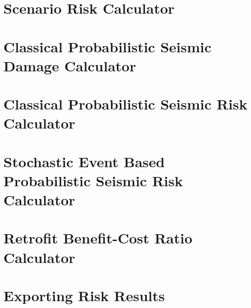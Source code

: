 \section{Scenario Risk Calculator}
\label{sec:config_scenario_risk}


\section{Classical Probabilistic Seismic Damage Calculator}
\label{sec:config_classical_damage}


\section{Classical Probabilistic Seismic Risk Calculator}
\label{sec:config_classical_risk}


\section{Stochastic Event Based Probabilistic Seismic Risk Calculator}
\label{sec:config_event_based_risk}


\section{Retrofit Benefit-Cost Ratio Calculator}
\label{sec:config_benefit_cost}


\section{Exporting Risk Results}
\label{sec:risk_export}



\cleardoublepage